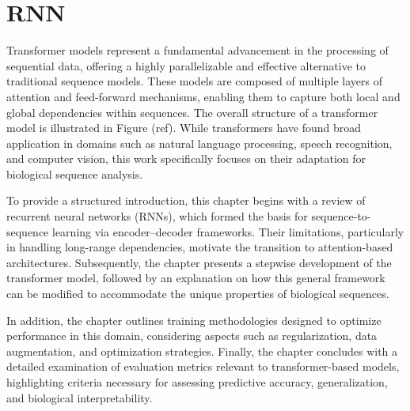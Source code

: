 \chapter{RNN}

Transformer models represent a fundamental advancement in the processing of sequential data, offering a highly parallelizable and effective alternative to traditional sequence models. These models are composed of multiple layers of attention and feed-forward mechanisms, enabling them to capture both local and global dependencies within sequences. The overall structure of a transformer model is illustrated in Figure (ref). While transformers have found broad application in domains such as natural language processing, speech recognition, and computer vision, this work specifically focuses on their adaptation for biological sequence analysis.

To provide a structured introduction, this chapter begins with a review of recurrent neural networks (RNNs), which formed the basis for sequence-to-sequence learning via encoder–decoder frameworks. Their limitations, particularly in handling long-range dependencies, motivate the transition to attention-based architectures. Subsequently, the chapter presents a stepwise development of the transformer model, followed by an explanation on how this general framework can be modified to accommodate the unique properties of biological sequences.

In addition, the chapter outlines training methodologies designed to optimize performance in this domain, considering aspects such as regularization, data augmentation, and optimization strategies. Finally, the chapter concludes with a detailed examination of evaluation metrics relevant to transformer-based models, highlighting criteria necessary for assessing predictive accuracy, generalization, and biological interpretability.


